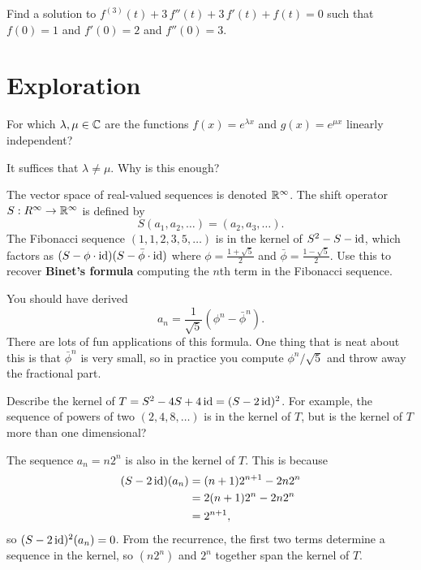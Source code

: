 \documentclass{homework}
\begin{document}
\begin{problem}
  Find a solution to $f^{(3)}(t) + 3 \, f''(t) + 3 \, f'(t) + f(t) = 0$ such that $f(0) = 1$ and $f'(0) = 2$ and $f''(0) = 3$.
\end{problem}

\section{Exploration}

\begin{problem}\label{independent-exponentials}For which $\lambda, \mu \in \mathbb{C}$ are the functions $f(x) = e^{\lambda x}$ and $g(x) = e^{\mu x}$ linearly independent?
\end{problem}

\begin{solution}
  It suffices that $\lambda \neq \mu$.  Why is this enough?
\end{solution}

\begin{problem}\label{fibonacci-sequence}The vector space of real-valued sequences is denoted $\mathbb{R}^\infty$.
  The shift operator $S : R^\infty \to \mathbb{R}^\infty$ is defined by
  \[
    S(a_1,a_2,\ldots) = (a_2,a_3,\ldots).
  \]
  The Fibonacci sequence $(1,1,2,3,5,\ldots)$ is in the kernel of $S^2 - S - \operatorname{id}$, which factors as $(S- \phi \cdot \operatorname{id})(S - \bar{\phi} \cdot \operatorname{id})$ where $\phi = \frac{1+\sqrt{5}}{2}$ and $\bar{\phi} = \frac{1-\sqrt{5}}{2}$.  Use this to recover \textbf{Binet's formula} computing the $n$th term in the Fibonacci sequence.  
\end{problem}

\begin{solution}
  You should have derived
  \[
    a_n = \frac{1}{\sqrt{5}} \left( \phi^n - \bar{\phi}^n \right).
  \]
  There are lots of fun applications of this formula.  One thing that
  is neat about this is that $\bar{\phi}^n$ is very small, so in
  practice you compute $\phi^n/\sqrt{5}$ and throw away the fractional
  part.
\end{solution}

\begin{problem}\label{shift-repeated-roots}Describe the kernel of $T = S^2 - 4S + 4\operatorname{id} = (S-2\operatorname{id})^2$.  For
  example, the sequence of powers of two $(2,4,8,\ldots)$ is in the
  kernel of $T$, but is the kernel of $T$ more than one dimensional?
\end{problem}

\begin{solution}
  The sequence $a_n = n 2^n$ is also in the kernel of $T$.  This is because
  \begin{align*}
    (S-2\operatorname{id})(a_n) &= (n+1) 2^{n+1} - 2 n 2^n \\
                  &= 2 (n+1) 2^{n} - 2 n 2^n \\
                  &= 2^{n+1},
  \end{align*}
  so $(S-2\operatorname{id})^2(a_n) = 0$.  From the recurrence, the first two terms determine a sequence in the kernel, so $(n 2^n)$ and $2^n$ together span the kernel of $T$.
\end{solution}
\end{document}
